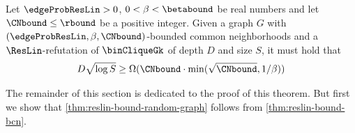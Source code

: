 \begin{theorem}
    \label{thm:reslin-bound-bcn}
    Let $\edgeProbResLin>0$, $0<\beta<\betabound$ be real numbers and let $\CNbound\leq \rbound$ be a positive integer. Given a graph $G$ with $(\edgeProbResLin,\beta,\CNbound)$-bounded common neighborhoods and a $\ResLin$-refutation of $\binCliqueGk$ of depth $D$ and size $S$, it must hold that 
    \begin{equation*}
        D\sqrt{\log S}\geq\Omega(\CNbound\cdot\min(\sqrt\CNbound,1/\beta))
    \end{equation*}
\end{theorem}

The remainder of this section is dedicated to the proof of this theorem. But first we show that \autoref{thm:reslin-bound-random-graph} follows from \autoref{thm:reslin-bound-bcn}.

